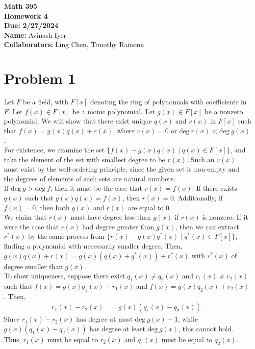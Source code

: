 \documentclass[8pt]{extarticle}
\title{}
\author{}
\date{}
\begin{document}
  \begin{center}
    {\bf \Large Math 395 \\[0.1in]Homework 4 \\[0.1in]
    Due: 2/27/2024}\\[.25in]
    {\bf Name:} {Avinash Iyer}\\[0.15in]
    {\bf Collaborators:} {Ling Chen, Timothy Rainone} \\
  \end{center}
  \section{Problem 1}%
  Let $F$ be a field, with $F[x]$ denoting the ring of polynomials with coefficients in $F$. Let $f(x)\in F[x]$ be a monic polynomial. Let $g(x) \in F[x]$ be a nonzero polynomial. We will show that there exist unique $q(x)$ and $r(x)$ in $F[x]$ such that $f(x) = g(x)q(x) + r(x)$, where $r(x) = 0$ or $\text{deg}~r(x) < \text{deg}~g(x)$.\\

  For existence, we examine the set $\{f(x) - g(x)q(x)\mid q(x)\in F[x]\}$, and take the element of the set with smallest degree to be $r(x)$. Such an $r(x)$ must exist by the well-ordering principle, since the given set is non-empty and the degrees of elements of such sets are natural numbers.\\

  If $\text{deg}~g > \text{deg}~f$, then it must be the case that $r(x) = f(x)$. If there exists $q(x)$ such that $g(x)q(x) = f(x)$, then $r(x) = 0$. Additionally, if $f(x) = 0$, then both $q(x)$ and $r(x)$ are equal to $0$.\\

  We claim that $r(x)$ must have degree less than $g(x)$ if $r(x)$ is nonzero. If it were the case that $r(x)$ had degree greater than $g(x)$, then we can extract $r^{\ast}(x)$ by the same process from $\{r(x) - g(x)q^{\ast}(x)\mid q^{\ast}(x)\in F[x]\}$, finding a polynomial with necessarily smaller degree. Then, $g(x)q(x) + r(x) = g(x)(q(x) + q^{\ast}(x)) + r^{\ast}(x)$ with $r^{\ast}(x)$ of degree smaller than $g(x)$.\\

  To show uniqueness, suppose there exist $q_1(x)\neq q_2(x)$ and $r_1(x)\neq r_2(x)$ such that $f(x) = g(x)q_1(x) + r_1(x)$ and $f(x)=g(x)q_2(x) + r_2(x)$. Then,
  \begin{align*}
    r_1(x)-r_2(x) &= g(x)\left(q_1(x)-q_2(x)\right).
  \end{align*}
  Since $r_1(x)-r_2(x)$ has degree at most $\text{deg}~g(x) - 1$, while $g(x)\left(q_1(x)-q_2(x)\right)$ has degree at least $\text{deg}~g(x)$, this cannot hold. Thus, $r_1(x)$ must be equal to $r_2(x)$ and $q_1(x)$ must be equal to $q_2(x)$.
\end{document}
